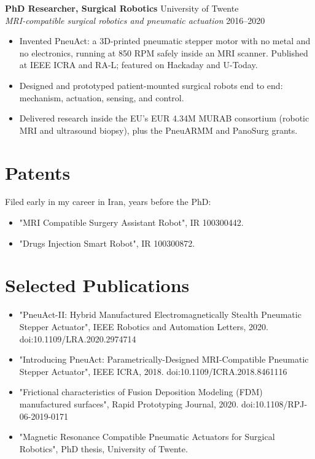 \documentclass[10pt,a4paper]{article}
\begin{document}
\vspace{4pt}
\textbf{PhD Researcher, Surgical Robotics} \hfill University of Twente \\
{\small\textit{MRI-compatible surgical robotics and pneumatic actuation}} \hfill {\small 2016--2020}
\begin{itemize}
  \item Invented PneuAct: a 3D-printed pneumatic stepper motor with no metal and no electronics, running at 850 RPM safely inside an MRI scanner. Published at IEEE ICRA and RA-L; featured on Hackaday and U-Today.
  \item Designed and prototyped patient-mounted surgical robots end to end: mechanism, actuation, sensing, and control.
  \item Delivered research inside the EU's EUR 4.34M MURAB consortium (robotic MRI and ultrasound biopsy), plus the PneuARMM and PanoSurg grants.
\end{itemize}

\section{Patents}
Filed early in my career in Iran, years before the PhD:
\begin{itemize}
  \item "MRI Compatible Surgery Assistant Robot", IR 100300442.
  \item "Drugs Injection Smart Robot", IR 100300872.
\end{itemize}

\section{Selected Publications}
\begin{itemize}
  \item "PneuAct-II: Hybrid Manufactured Electromagnetically Stealth Pneumatic Stepper Actuator", IEEE Robotics and Automation Letters, 2020. doi:10.1109/LRA.2020.2974714
  \item "Introducing PneuAct: Parametrically-Designed MRI-Compatible Pneumatic Stepper Actuator", IEEE ICRA, 2018. doi:10.1109/ICRA.2018.8461116
  \item "Frictional characteristics of Fusion Deposition Modeling (FDM) manufactured surfaces", Rapid Prototyping Journal, 2020. doi:10.1108/RPJ-06-2019-0171
  \item "Magnetic Resonance Compatible Pneumatic Actuators for Surgical Robotics", PhD thesis, University of Twente.
\end{itemize}
\end{document}
